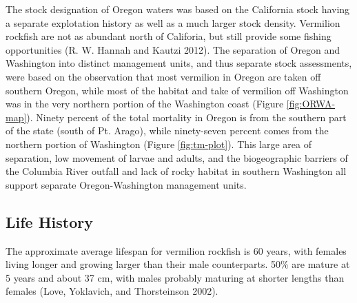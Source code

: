 \documentclass[11pt,
  english,
  a4paper,
]{article}
\begin{document}

The stock designation of Oregon waters was based on the California stock having a separate explotation history as well as a much larger stock density. Vermilion rockfish are not as abundant north of Califoria, but still provide some fishing opportunities {(R. W. Hannah and Kautzi 2012)\leavevmode\tagmcend\tagstructend}. The separation of Oregon and Washington into distinct management units, and thus separate stock assessments, were based on the observation that most vermilion in Oregon are taken off southern Oregon, while most of the habitat and take of vermilion off Washington was in the very northern portion of the Washington coast (Figure \ref{fig:ORWA-map}). Ninety percent of the total mortality in Oregon is from the southern part of the state (south of Pt. Arago), while ninety-seven percent comes from the northern portion of Washington (Figure \ref{fig:tm-plot}). This large area of separation, low movement of larvae and adults, and the biogeographic barriers of the Columbia River outfall and lack of rocky habitat in southern Washington all support separate Oregon-Washington management units.

\leavevmode\tagmcend\tagstructend\par


\hypertarget{life-history}{%
\subsection{Life History}\label{life-history}}

\leavevmode\tagmcend\tagstructend


The approximate average lifespan for vermilion rockfish is 60 years, with females living longer and growing larger than their male counterparts. 50\% are mature at 5 years and about 37 cm, with males probably maturing at shorter lengths than females {(Love, Yoklavich, and Thorsteinson 2002)\leavevmode\tagmcend\tagstructend}.

\leavevmode\tagmcend\tagstructend\par

\end{document}
